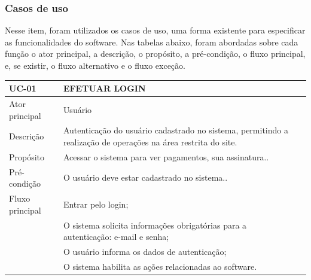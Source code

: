 \documentclass[a4paper,12pt]{article}
\begin{document}
\subsubsection{Casos de uso}
\hspace{0.5cm}Nesse item, foram utilizados os casos de uso, uma forma existente para especificar
as funcionalidades do software. Nas tabelas abaixo, foram abordadas sobre cada função o
ator principal, a descrição, o propósito, a pré-condição, o fluxo principal, e, se existir, o fluxo
alternativo e o fluxo exceção.
\begin{table}[ht]
    \centering
    \begin{tabular}{|p{3.5cm}|p{10cm}|p{7cm}|}
        \hline
        \textbf{UC-01}                  & \textbf{EFETUAR LOGIN}                                                           \\
        \hline

        \multirow{1}{*}{Ator principal} & Usuário                                                                          \\
        \hline
        \multirow{1}{*}{Descrição}      & Autenticação do usuário cadastrado no sistema, permitindo a realização
        de operações na área restrita do site.                                                                             \\
        \hline

        \multirow{1}{*}{Propósito}      & Acessar o sistema para ver pagamentos, sua assinatura..                          \\
        \hline

        \multirow{1}{*}{Pré-condição}   & O usuário deve estar cadastrado no sistema..                                     \\
        \hline

        \multirow{1}{*}{Fluxo principal}
                                        & Entrar pelo login;                                                               \\
                                        & O sistema solicita informações obrigatórias para a autenticação: e-mail e senha; \\
                                        & O usuário informa os dados de autenticação;                                      \\
                                        & O sistema habilita as ações relacionadas ao software.                            \\
        \cline{2-2}
        \hline


\end{tabular}
\end{table}
\end{document}
